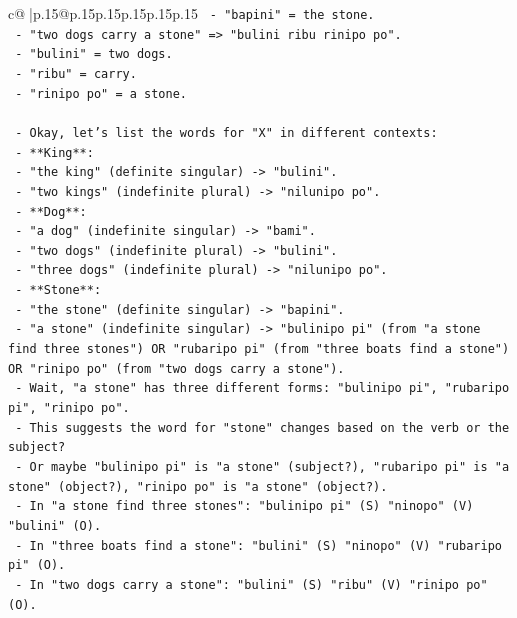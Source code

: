\documentclass{article}
\begin{document}
{\begin{supertabular}{c@{$\;$}|p{.15\linewidth}@{}p{.15\linewidth}p{.15\linewidth}p{.15\linewidth}p{.15\linewidth}p{.15\linewidth}}
{{{\texttt{                     {-} "bapini" = the stone.} \\
\texttt{                   {-} "two dogs carry a stone" => "bulini ribu rinipo po".} \\
\texttt{                     {-} "bulini" = two dogs.} \\
\texttt{                     {-} "ribu" = carry.} \\
\texttt{                     {-} "rinipo po" = a stone.} \\
\\ 
\texttt{   {-} Okay, let's list the words for "X" in different contexts:} \\
\texttt{     {-} **King**:} \\
\texttt{       {-} "the king" (definite singular) {-}> "bulini".} \\
\texttt{       {-} "two kings" (indefinite plural) {-}> "nilunipo po".} \\
\texttt{     {-} **Dog**:} \\
\texttt{       {-} "a dog" (indefinite singular) {-}> "bami".} \\
\texttt{       {-} "two dogs" (indefinite plural) {-}> "bulini".} \\
\texttt{       {-} "three dogs" (indefinite plural) {-}> "nilunipo po".} \\
\texttt{     {-} **Stone**:} \\
\texttt{       {-} "the stone" (definite singular) {-}> "bapini".} \\
\texttt{       {-} "a stone" (indefinite singular) {-}> "bulinipo pi" (from "a stone find three stones") OR "rubaripo pi" (from "three boats find a stone") OR "rinipo po" (from "two dogs carry a stone").} \\
\texttt{         {-} Wait, "a stone" has three different forms: "bulinipo pi", "rubaripo pi", "rinipo po".} \\
\texttt{         {-} This suggests the word for "stone" changes based on the verb or the subject?} \\
\texttt{         {-} Or maybe "bulinipo pi" is "a stone" (subject?), "rubaripo pi" is "a stone" (object?), "rinipo po" is "a stone" (object?).} \\
\texttt{         {-} In "a stone find three stones": "bulinipo pi" (S) "ninopo" (V) "bulini" (O).} \\
\texttt{         {-} In "three boats find a stone": "bulini" (S) "ninopo" (V) "rubaripo pi" (O).} \\
\texttt{         {-} In "two dogs carry a stone": "bulini" (S) "ribu" (V) "rinipo po" (O).} \\
}}}
\end{supertabular}}
\end{document}
